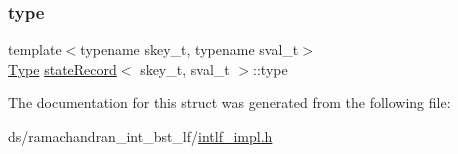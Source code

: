 \subsubsection{\texorpdfstring{type}{type}}
{\footnotesize\ttfamily template$<$typename skey\+\_\+t, typename sval\+\_\+t$>$ \\
\hyperlink{intlf__impl_8h_a1d1cfd8ffb84e947f82999c682b666a7}{Type} \hyperlink{structstateRecord}{state\+Record}$<$ skey\+\_\+t, sval\+\_\+t $>$\+::type}



The documentation for this struct was generated from the following file\+:\begin{DoxyCompactItemize}
\item 
ds/ramachandran\+\_\+int\+\_\+bst\+\_\+lf/\hyperlink{intlf__impl_8h}{intlf\+\_\+impl.\+h}\end{DoxyCompactItemize}
